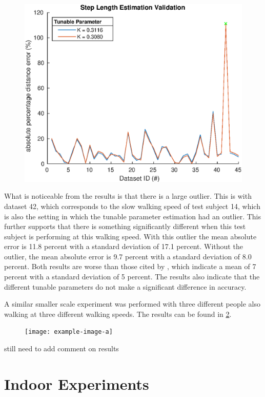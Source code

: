 \begin{figure}[H]
	\centering
	\includegraphics[width=0.6\linewidth]{images/20201028_1344_Step_Length_Estimation_Validation}
	\caption{}
	\label{fig:step_length_estimation_validation}
\end{figure}

What is noticeable from the results is that there is a large outlier. This is with dataset 42, which corresponds to the slow walking speed of test subject 14, which is also the setting in which the tunable parameter estimation had an outlier. This further supports that there is something significantly different when this test subject is performing at this walking speed. With this outlier the mean absolute error is 11.8 percent with a standard deviation of 17.1 percent. Without the outlier, the mean absolute error is 9.7 percent with a standard deviation of 8.0 percent. Both results are worse than those cited by \cite{Vezocnik2019}, which indicate a mean of 7 percent with a standard deviation of 5 percent.
The results also indicate that the different tunable parameters do not make a significant difference in accuracy. \par 
A similar smaller scale experiment was performed with three different people also walking at three different walking speeds. The results can be found in \cref{fig:step_length_personal_testing}. 
\begin{figure}[H]
	\centering
	\texttt{[image: example-image-a]}
	\caption{}
	\label{fig:step_length_personal_testing}
\end{figure}

{\color{red} still need to add comment on results }

\newpage

\section{Indoor Experiments}


